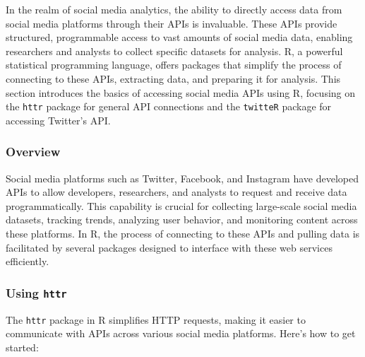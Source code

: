 \documentclass[
]{book}
\begin{document}
In the realm of social media analytics, the ability to directly access data from social media platforms through their APIs is invaluable. These APIs provide structured, programmable access to vast amounts of social media data, enabling researchers and analysts to collect specific datasets for analysis. R, a powerful statistical programming language, offers packages that simplify the process of connecting to these APIs, extracting data, and preparing it for analysis. This section introduces the basics of accessing social media APIs using R, focusing on the \texttt{httr} package for general API connections and the \texttt{twitteR} package for accessing Twitter's API.

\hypertarget{overview-10}{%
\subsubsection{Overview}\label{overview-10}}

Social media platforms such as Twitter, Facebook, and Instagram have developed APIs to allow developers, researchers, and analysts to request and receive data programmatically. This capability is crucial for collecting large-scale social media datasets, tracking trends, analyzing user behavior, and monitoring content across these platforms. In R, the process of connecting to these APIs and pulling data is facilitated by several packages designed to interface with these web services efficiently.

\hypertarget{using-httr}{%
\subsubsection{\texorpdfstring{Using \texttt{httr}}{Using httr}}\label{using-httr}}

The \texttt{httr} package in R simplifies HTTP requests, making it easier to communicate with APIs across various social media platforms. Here's how to get started:
\end{document}
